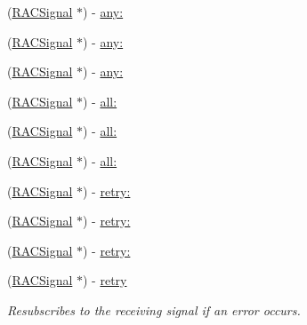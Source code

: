 \begin{DoxyCompactItemize}
\item 
(\mbox{\hyperlink{interface_r_a_c_signal}{R\+A\+C\+Signal}} $\ast$) -\/ \mbox{\hyperlink{interface_r_a_c_signal_a4bfb6af6556526457fbf0e5d3c878536}{any\+:}}
\item 
(\mbox{\hyperlink{interface_r_a_c_signal}{R\+A\+C\+Signal}} $\ast$) -\/ \mbox{\hyperlink{interface_r_a_c_signal_a4bfb6af6556526457fbf0e5d3c878536}{any\+:}}
\item 
(\mbox{\hyperlink{interface_r_a_c_signal}{R\+A\+C\+Signal}} $\ast$) -\/ \mbox{\hyperlink{interface_r_a_c_signal_a4bfb6af6556526457fbf0e5d3c878536}{any\+:}}
\item 
(\mbox{\hyperlink{interface_r_a_c_signal}{R\+A\+C\+Signal}} $\ast$) -\/ \mbox{\hyperlink{interface_r_a_c_signal_adb70e0b813cec0b7bcc5c76f2f3cd88f}{all\+:}}
\item 
(\mbox{\hyperlink{interface_r_a_c_signal}{R\+A\+C\+Signal}} $\ast$) -\/ \mbox{\hyperlink{interface_r_a_c_signal_adb70e0b813cec0b7bcc5c76f2f3cd88f}{all\+:}}
\item 
(\mbox{\hyperlink{interface_r_a_c_signal}{R\+A\+C\+Signal}} $\ast$) -\/ \mbox{\hyperlink{interface_r_a_c_signal_adb70e0b813cec0b7bcc5c76f2f3cd88f}{all\+:}}
\item 
(\mbox{\hyperlink{interface_r_a_c_signal}{R\+A\+C\+Signal}} $\ast$) -\/ \mbox{\hyperlink{interface_r_a_c_signal_a3601540c46ceb34dbd1c242782022809}{retry\+:}}
\item 
(\mbox{\hyperlink{interface_r_a_c_signal}{R\+A\+C\+Signal}} $\ast$) -\/ \mbox{\hyperlink{interface_r_a_c_signal_a3601540c46ceb34dbd1c242782022809}{retry\+:}}
\item 
(\mbox{\hyperlink{interface_r_a_c_signal}{R\+A\+C\+Signal}} $\ast$) -\/ \mbox{\hyperlink{interface_r_a_c_signal_a3601540c46ceb34dbd1c242782022809}{retry\+:}}
\item 
\mbox{\label{interface_r_a_c_signal_a4fb19910fa59ca689d5f63bbd880e1e8}} 
(\mbox{\hyperlink{interface_r_a_c_signal}{R\+A\+C\+Signal}} $\ast$) -\/ \mbox{\hyperlink{interface_r_a_c_signal_a4fb19910fa59ca689d5f63bbd880e1e8}{retry}}
\begin{DoxyCompactList}\small\item\em Resubscribes to the receiving signal if an error occurs. \end{DoxyCompactList}\item 
\mbox{\label{interface_r_a_c_signal_a4fb19910fa59ca689d5f63bbd880e1e8}} 

\end{DoxyCompactItemize}
